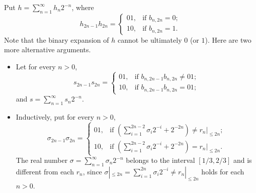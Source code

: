\documentclass[12pt]{article}
\begin{document}
Put $h=\sum_{n=1}^{\infty}h_n2^{-n}$, where
$$h_{2n-1}h_{2n}=\begin{cases}
                   01, & \mbox{if } b_{n,2n}=0; \\
                   10, & \mbox{if } b_{n,2n}=1.
                 \end{cases}$$
Note that the binary expansion of $h$ cannot be ultimately $0$ (or $1$).
Here are two more alternative arguments.
\begin{itemize}
  \item[({\sc i})] Let for every $n>0$, $$s_{2n-1}s_{2n}=\begin{cases}
                         01, & \mbox{if } b_{n,2n-1}b_{n,2n}\neq 01; \\
                         10, & \mbox{if } b_{n,2n-1}b_{n,2n} = 01;
                       \end{cases}$$
and $s=\sum_{n=1}^{\infty}s_n2^{-n}$.
  \item[({\sc ii})] Inductively, put for every $n>0$,
$$\sigma_{2n-1}\sigma_{2n}=\begin{cases}
                         01, & \mbox{if } (\sum_{i=1}^{2n-2}\sigma_i2^{-i} + 2^{-2n}) \neq r_n|_{\leqslant 2n}; \\
                         10, & \mbox{if } (\sum_{i=1}^{2n-2}\sigma_i2^{-i} + 2^{-2n}) = r_n|_{\leqslant 2n}.
                       \end{cases}$$
The real number $\sigma=\sum_{n=1}^{\infty}\sigma_n2^{-n}$ belongs to the  interval $[1/3 , 2/3]$ and is different from each $r_n$, since $\sigma|_{\leqslant 2n}
= \sum_{i=1}^{2n}\sigma_i2^{-i}
 \neq
r_n|_{\leqslant 2n}$ holds for each $n>0$.
\end{itemize}
\end{document}

